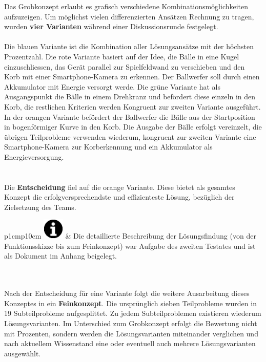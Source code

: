 Das Grobkonzept erlaubt es grafisch verschiedene Kombinationsmöglichkeiten aufzuzeigen. Um möglichst vielen differenzierten Ansätzen Rechnung zu tragen, wurden \textbf{vier Varianten} während einer Diskussionsrunde festgelegt.\\\\ 

Die blauen Variante ist die Kombination aller Lösungsansätze mit der höchsten Prozentzahl. Die rote Variante basiert auf der Idee, die Bälle in eine Kugel einzuschliessen, das Gerät parallel zur Spielfeldwand zu verschieben und den Korb mit einer Smartphone-Kamera zu erkennen. Der Ballwerfer soll durch einen Akkumulator mit Energie versorgt werde. Die grüne Variante hat als Ausgangspunkt die Bälle in einem Drehkranz und befördert diese einzeln in den Korb, die restlichen Kriterien werden Kongruent zur zweiten Variante ausgeführt. In der orangen Variante befördert der Ballwerfer die Bälle aus der Startposition in bogenförmiger Kurve in den Korb. Die Ausgabe der Bälle erfolgt vereinzelt, die übrigen Teilprobleme verwenden wiederum, kongruent zur zweiten Variante eine Smartphone-Kamera zur Korberkennung und ein Akkumulator als Energieversorgung.\\
\\\\
Die \textbf{Entscheidung} fiel auf die orange Variante. Diese bietet als gesamtes Konzept die erfolgversprechendste und effizienteste Lösung, bezüglich der Zielsetzung des Teams. \\

\begin{tabular}{p{1cm}p{10cm}}
		{\includegraphics[width=1cm]{Enddokumentation/Varianten/Bilder/info_icon.png}}
	 & Die detaillierte Beschreibung der Lösungsfindung (von der Funktionsskizze bis zum Feinkonzept) war Aufgabe des zweiten Testates und ist als Dokument im Anhang beigelegt. \\
\end{tabular}
\\\\

Nach der Entscheidung für eine Variante folgt die weitere Ausarbeitung dieses Konzeptes
in ein \textbf{Feinkonzept}. Die ursprünglich sieben Teilprobleme wurden in 19 Subteilprobleme
aufgesplittet. Zu jedem Subteilproblemen existieren wiederum Lösungsvarianten. Im Unterschied zum Grobkonzept erfolgt die Bewertung nicht mit Prozenten, sondern werden die Lösungsvarianten miteinander verglichen und nach aktuellem Wissenstand eine oder eventuell auch mehrere Lösungsvarianten ausgewählt. 


